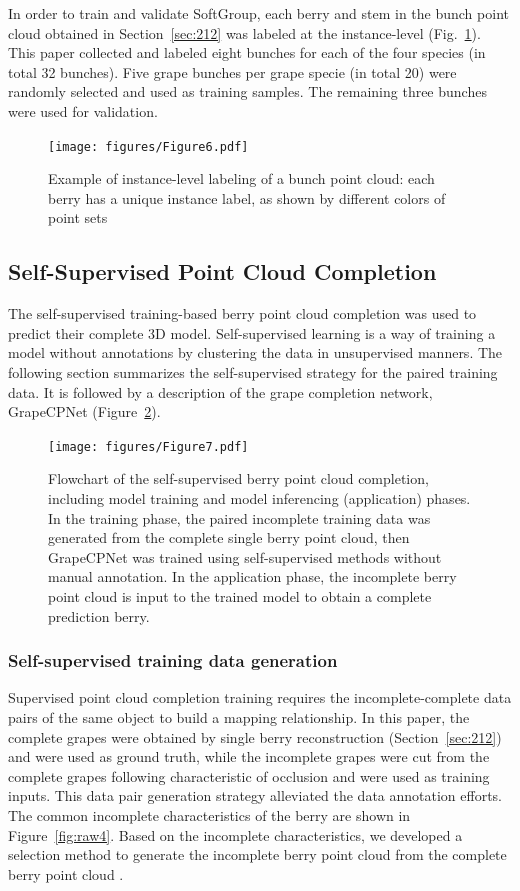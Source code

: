 \documentclass[12pt]{article}
\begin{document}
In order to train and validate SoftGroup, each berry and stem in the bunch point cloud obtained in Section~\ref{sec:212} was labeled at the instance-level (Fig.~\ref{fig:raw11}). 
This paper collected and labeled eight bunches for each of the four species (in total 32 bunches). 
Five grape bunches per grape specie (in total 20) were randomly selected and used as training samples. The remaining three bunches were used for validation.

\begin{figure}[hbt!]
    \centering
    \texttt{[image: figures/Figure6.pdf]}
    \caption{Example of instance-level labeling of a bunch point cloud: each berry has a unique instance label, as shown by different colors of point sets}
    \label{fig:raw11}
\end{figure}

\subsection{Self-Supervised Point Cloud Completion}

The self-supervised training-based berry point cloud completion was used to predict their complete 3D model. 
Self-supervised learning is a way of training a model without annotations by clustering the data in unsupervised manners. 
The following section summarizes the self-supervised strategy for the paired training data. It is followed by a description of the grape completion network, GrapeCPNet (Figure~\ref{fig:raw3}).

\begin{figure}[hbt!]
    \centering
    \texttt{[image: figures/Figure7.pdf]}
    \caption{Flowchart of the self-supervised berry point cloud completion, including model training and model inferencing (application) phases. In the training phase, the paired incomplete training data was generated from the complete single berry point cloud, then GrapeCPNet was trained using self-supervised methods without manual annotation. In the application phase, the incomplete berry point cloud is input to the trained model to obtain a complete prediction berry.}
    \label{fig:raw3}
\end{figure}

\subsubsection{Self-supervised training data generation}
\label{sec:berrycut}

Supervised point cloud completion training requires the incomplete-complete data pairs of the same object to build a mapping relationship. 
In this paper, the complete grapes were obtained by single berry reconstruction (Section~\ref{sec:212}) and were used as ground truth, while the incomplete grapes were cut from the complete grapes following characteristic of occlusion and were used as training inputs. 
This data pair generation strategy alleviated the data annotation efforts. The common incomplete characteristics of the berry are shown in Figure~\ref{fig:raw4}.
Based on the incomplete characteristics, we developed a selection method to generate the incomplete berry point cloud from the complete berry point cloud .
\end{document}

